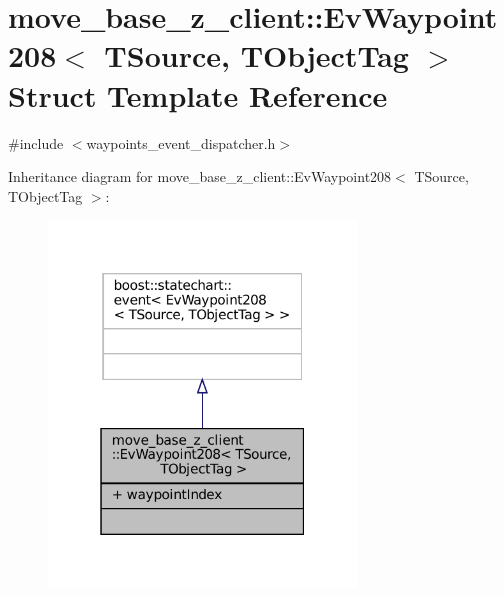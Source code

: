 \hypertarget{structmove__base__z__client_1_1EvWaypoint208}{}\section{move\+\_\+base\+\_\+z\+\_\+client\+:\+:Ev\+Waypoint208$<$ T\+Source, T\+Object\+Tag $>$ Struct Template Reference}
\label{structmove__base__z__client_1_1EvWaypoint208}


{\ttfamily \#include $<$waypoints\+\_\+event\+\_\+dispatcher.\+h$>$}



Inheritance diagram for move\+\_\+base\+\_\+z\+\_\+client\+:\+:Ev\+Waypoint208$<$ T\+Source, T\+Object\+Tag $>$\+:
\nopagebreak
\begin{figure}[H]
\begin{center}
\leavevmode
\includegraphics[width=232pt]{structmove__base__z__client_1_1EvWaypoint208__inherit__graph}
\end{center}
\end{figure}


